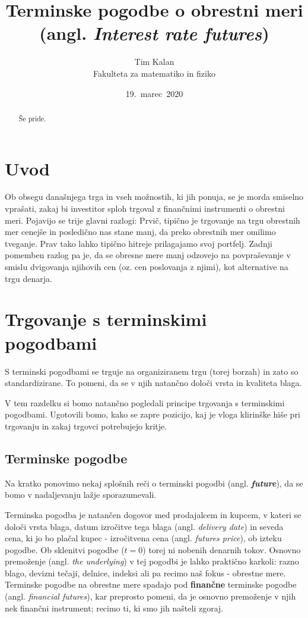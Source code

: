 \documentclass[a4paper, 11pt]{article}
\author{Tim Kalan \\ Fakulteta za matematiko in fiziko}
\title{
    Terminske pogodbe o obrestni meri \\ 
    \large (angl. \textit{Interest rate futures})}
\date{19.\ marec\ 2020} %
\begin{document}
\begin{titlepage}
    \maketitle
    \thispagestyle{empty}
\end{titlepage}

\pagebreak

\begin{abstract}
    Še pride.
\end{abstract}

\pagebreak

\tableofcontents

\pagebreak

\section{Uvod}
Ob obsegu današnjega trga in vseh možnostih, ki jih ponuja, se je morda smiselno vprašati,
zakaj bi investitor sploh trgoval z finančnimi instrumenti o obrestni meri. Pojavijo se trije
glavni razlogi: Prvič, tipično je trgovanje na trgu obrestnih mer cenejše in posledično nas 
stane manj, da preko obrestnih mer omilimo tveganje. Prav tako lahko tipično hitreje prilagajamo svoj 
portfelj. Zadnji pomemben razlog pa je, da se obresne mere manj odzovejo na povpraševanje v 
smislu dvigovanja njihovih cen (oz. cen poslovanja z njimi), kot alternative na trgu denarja.

\section{Trgovanje s terminskimi pogodbami}
S terminski pogodbami se trguje na organiziranem trgu (torej borzah) in zato so standardizirane. 
To pomeni, da se v njih natančno določi vrsta in kvaliteta blaga.

V tem razdelku si bomo natančno pogledali principe trgovanja s terminskimi pogodbami. Ugotovili
bomo, kako se zapre pozicijo, kaj je vloga klirinške hiše pri trgovanju in zakaj trgovci potrebujejo
kritje.

\subsection{Terminske pogodbe}
Na kratko ponovimo nekaj splošnih reči o terminski pogodbi (angl. \textit{\textbf{future}}), da se 
bomo v nadaljevanju lažje sporazumevali.

Terminska pogodba je natančen dogovor med prodajalcem in kupcem, v kateri se določi vrsta
blaga, datum izročitve tega blaga (angl. \textit{delivery date}) in seveda cena, 
ki jo bo plačal kupec - izročitvena cena (angl. \textit{futures price}), ob izteku pogodbe. 
Ob sklenitvi pogodbe ($t = 0$) torej ni nobenih denarnih tokov.
Osnovno premoženje (angl. \textit{the underlying}) v tej pogodbi je lahko praktično karkoli: 
razno blago, devizni tečaji, delnice, indeksi ali pa recimo naš fokus - obrestne mere. 
Terminske pogodbe na obrestne mere spadajo pod \textbf{finančne} terminske pogodbe 
(angl. \textit{financial futures}), kar preprosto pomeni, da je osnovno premoženje v njih nek
finančni instrument; recimo ti, ki smo jih našteli zgoraj.
\end{document}
